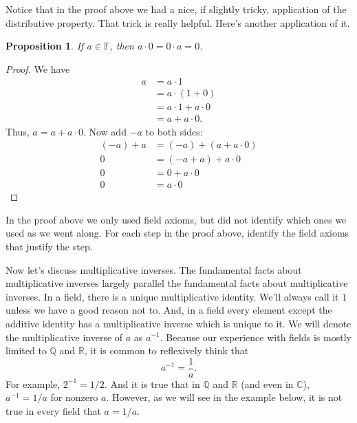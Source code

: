 \documentclass[11pt]{article}
\newenvironment{task}
	{\begin{mdframed}[linecolor=lightgray, linewidth=3pt]\raggedright}
	{\end{mdframed}}
\newtheorem{proposition}[theorem]{Proposition}
\theoremstyle{definition}
\begin{document}
Notice that in the proof above we had a nice, if slightly tricky, application of the distributive property. That trick is really helpful. Here's another 
application of it.

\begin{proposition}
  If $a\in\mathbb{F}$, then $a\cdot 0 = 0 \cdot a = 0$.
\end{proposition}
\begin{proof}
  We have 
  \begin{align*}
  a &= a\cdot 1\\
    &= a\cdot (1+0)\\
    &= a\cdot 1 + a\cdot 0\\
    &= a + a\cdot 0.
  \end{align*}
  Thus, $a = a + a \cdot 0$. Now add $-a$ to both sides:
  \begin{align*}
   (-a) + a &= (-a) + (a + a\cdot 0)\\
   0 &= (-a + a) + a\cdot 0\\
   0 &= 0 + a\cdot 0\\
   0 &= a\cdot 0
  \end{align*}
\end{proof}

\begin{task}
  In the proof above we only used field axioms, but did not identify which ones we used as we went along. For each step in the proof above, identify the
  field axioms that justify the step.
\end{task}

Now let's discuss multiplicative inverses. The fundamental facts about multiplicative inverses largely parallel the fundamental facts about multiplicative inverses. In a field, there is a unique
multiplicative identity. We'll always call it $1$ unless we have a good reason not to. And, in a field every element except the additive identity has a multiplicative inverse which is unique to it.
We will denote the multiplicative inverse of $a$ as $a^{-1}$. Because our experience with fields is mostly limited to $\mathbb{Q}$ and $\mathbb{R}$, it is common to reflexively think that 
\[ a^{-1} = \frac{1}{a}. \]
For example, $2^{-1} = 1/2$. And it is true that in $\mathbb{Q}$ and $\mathbb{R}$ (and even in $\mathbb{C}$), $a^{-1} = 1/a$ for nonzero $a$. However, as we will 
see in the example below, it is not true in every field that $a = 1/a$. 
\end{document}
